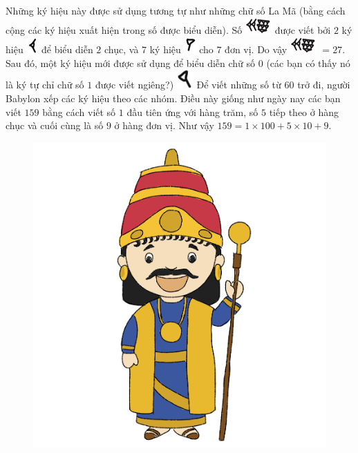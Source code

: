\begin{multicols}{2}
	\vskip 0.1cm
	Những ký hiệu này được sử dụng tương tự như những chữ số La Mã (bằng cách cộng các ký hiệu xuất hiện trong số được biểu diễn). Số \includegraphics[scale=0.7]{18} được viết bởi $2$ ký hiệu \includegraphics[scale=0.7]{16} để biểu diễn $2$ chục, và $7$ ký hiệu \includegraphics[scale=0.7]{15}  cho $7$ đơn vị. Do vậy \includegraphics[scale=0.7]{18}  $=27$.
	\vskip 0.1cm
	Sau đó, một ký hiệu mới được sử dụng để biểu diễn chữ số $0$ (các bạn có thấy nó là ký tự chỉ chữ số $1$ được viết ngiêng?)
	\includegraphics[scale=0.65]{15.1}
	\vskip 0.1cm
	Để viết những số từ $60$ trở đi, người Babylon xếp các ký hiệu theo các nhóm. Điều này giống như ngày nay các bạn viết $159$ bằng cách viết số $1$ đầu tiên ứng với hàng trăm, số $5$ tiếp theo ở hàng chục và cuối cùng là số $9$ ở hàng đơn vị. Như vậy $159 = 1 \times 100+ 5 \times 10+ 9$.
	\vskip 0.1cm
	\begin{figure}[H]
		\centering
		\vspace*{-5pt}
		\captionsetup{labelformat= empty, justification=centering}
		\includegraphics[width=0.85\linewidth]{20.12-pi.2}

\end{figure}
\end{multicols}
